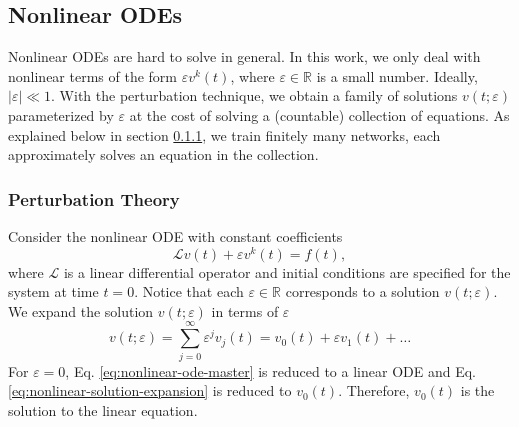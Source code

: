 \documentclass[accepted]{uai2023}
\renewcommand{\L}{\mathcal{L}}
\begin{document}
\subsection{Nonlinear ODEs}
    Nonlinear ODEs are hard to solve in general. 
    In this work, we only deal with nonlinear terms of the form $\varepsilon v^k(t)$, where $\varepsilon \in \mathbb{R}$ is a small number. 
    Ideally, $|\varepsilon| \ll 1$. 
    With the perturbation technique, we obtain a family of solutions $v(t;\varepsilon)$ parameterized by $\varepsilon$ at the cost of solving a (countable) collection of equations. 
    As explained below in section \ref{section:perturbation-theory}, we train finitely many networks, each approximately solves an equation in the collection.

\subsubsection{Perturbation Theory} \label{section:perturbation-theory}
    Consider the nonlinear ODE with constant coefficients
    \begin{equation} \label{eq:nonlinear-ode-master}
        \L v(t) + \varepsilon v^k(t) = f(t),
    \end{equation}
    where $\L$ is a linear differential operator and initial conditions are specified for the system at time $t=0$. 
    Notice that each $\varepsilon \in \mathbb{R}$ corresponds to a solution $v(t; \varepsilon)$. 
    We expand the solution $v(t; \varepsilon)$ in terms of $\varepsilon$
    \begin{equation} \label{eq:nonlinear-solution-expansion}
        v(t; \varepsilon) = \sum_{j=0}^{\infty} \varepsilon^j v_j(t) = v_0(t) + \varepsilon v_1(t) + \dots
    \end{equation}
    For $\varepsilon = 0$, Eq. \ref{eq:nonlinear-ode-master} is reduced to a linear ODE and Eq. \ref{eq:nonlinear-solution-expansion} is reduced to $v_0(t)$. Therefore, $v_0(t)$ is the solution to the linear equation. 
\end{document}
